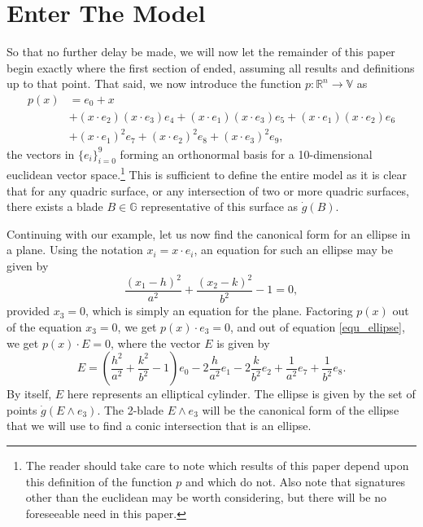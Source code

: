 \documentclass{birkjour}
\theoremstyle{definition}
\theoremstyle{remark}
\numberwithin{equation}{section}
\newcommand{\R}{\mathbb{R}}
\newcommand{\G}{\mathbb{G}}
\newcommand{\V}{\mathbb{V}}
\newcommand{\gd}{\dot{g}}
\begin{document}
\section{Enter The Model}

So that no further delay be made, we will now let the remainder of this paper begin
exactly where the first section of \cite{} ended, assuming all results and definitions up to that point.
That said, we now introduce the function $p:\R^n\to\V$ as
\begin{align*}
p(x) &= e_0 + x \\
 &+ (x\cdot e_2)(x\cdot e_3)e_4 + (x\cdot e_1)(x\cdot e_3)e_5 + (x\cdot e_1)(x\cdot e_2)e_6 \\
 &+ (x\cdot e_1)^2e_7 + (x\cdot e_2)^2e_8 + (x\cdot e_3)^2 e_9,
\end{align*}
the vectors in $\{e_i\}_{i=0}^9$ forming an orthonormal basis for a 10-dimensional
euclidean vector space.\footnote{The reader should take care to note which results of this paper
depend upon this definition of the function $p$ and which do not.  Also note that signatures
other than the euclidean may be worth considering, but there will be no foreseeable need in this paper.}
This is sufficient to define the entire model as it is clear that for any quadric
surface, or any intersection of two or more quadric surfaces, there exists a blade
$B\in\G$ representative of this surface as $\gd(B)$.

Continuing with our example, let us now find the canonical form for an ellipse
in a plane.  Using the notation $x_i = x\cdot e_i$, an equation for such an ellipse
may be given by
\begin{equation}\label{equ_ellipse}
\frac{(x_1-h)^2}{a^2} + \frac{(x_2-k)^2}{b^2} - 1 = 0,
\end{equation}
provided $x_3=0$, which is simply an equation for the plane.
Factoring $p(x)$ out of the equation $x_3=0$, we get $p(x)\cdot e_3=0$,
and out of equation \eqref{equ_ellipse}, we get $p(x)\cdot E=0$, where the
vector $E$ is given by
\begin{equation*}
E = \left(\frac{h^2}{a^2} + \frac{k^2}{b^2} - 1\right)e_0 -
  2\frac{h}{a^2}e_1 - 2\frac{k}{b^2}e_2 + \frac{1}{a^2}e_7 + \frac{1}{b^2}e_8.
\end{equation*}
By itself, $E$ here represents an elliptical cylinder.  The ellipse is given by
the set of points $\gd(E\wedge e_3)$.  The 2-blade $E\wedge e_3$ will be the
canonical form of the ellipse that we will use to find a conic intersection that
is an ellipse.
\end{document}
